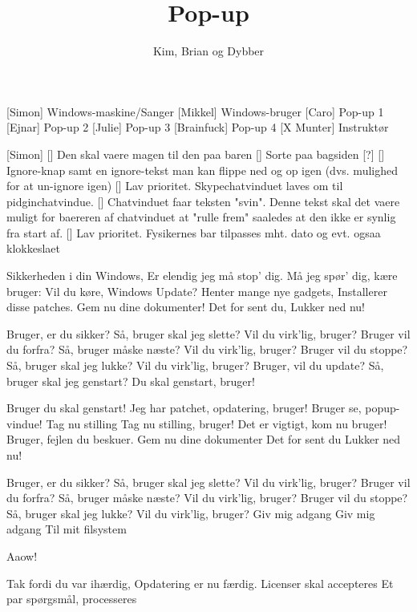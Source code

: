 \documentclass[a4paper,11pt]{article}
\title{Pop-up}
\author{Kim, Brian og Dybber}
\begin{document}
\maketitle

\begin{roles}
[Simon] Windows-maskine/Sanger
[Mikkel] Windows-bruger
[Caro] Pop-up 1
[Ejnar] Pop-up 2
[Julie] Pop-up 3
[Brainfuck] Pop-up 4
[X Munter] Instruktør
\end{roles}

\begin{props}
[Simon]
[] Den skal vaere magen til den paa baren
[] Sorte paa bagsiden
[?]
[] Ignore-knap samt en ignore-tekst man kan flippe ned og op igen (dvs. mulighed for at un-ignore igen)
[] Lav prioritet. Skypechatvinduet laves om til pidginchatvindue.
[] Chatvinduet faar teksten "svin". Denne tekst skal det vaere muligt for baereren af chatvinduet at "rulle frem" saaledes at den ikke er synlig fra start af.
[] Lav prioritet. Fysikernes bar tilpasses mht. dato og evt. ogsaa klokkeslaet
\end{props}


\begin{song}
Sikkerheden i din Windows,
Er elendig jeg må stop' dig.
Må jeg spør' dig, kære bruger:
Vil du køre, Windows Update?
Henter mange nye gadgets,
Installerer disse patches.
Gem nu dine dokumenter!
Det for sent du,
Lukker ned nu!

Bruger, er du sikker?
Så, bruger skal jeg slette?
Vil du virk'lig, bruger?
Bruger vil du forfra?
Så, bruger måske næste?
Vil du virk'lig, bruger?
Bruger vil du stoppe?
Så, bruger skal jeg lukke?
Vil du virk'lig, bruger?
Bruger, vil du update?
Så, bruger skal jeg genstart?
Du skal genstart, bruger!

Bruger du skal genstart!
Jeg har patchet, opdatering, bruger!
Bruger se, popup-vindue!
Tag nu stilling
Tag nu stilling, bruger!
Det er vigtigt, kom nu bruger!
Bruger, fejlen du beskuer.
Gem nu dine dokumenter
Det for sent du
Lukker ned nu!

Bruger, er du sikker?
Så, bruger skal jeg slette?
Vil du virk'lig, bruger?
Bruger vil du forfra?
Så, bruger måske næste?
Vil du virk'lig, bruger?
Bruger vil du stoppe?
Så, bruger skal jeg lukke?
Vil du virk'lig, bruger?
Giv mig adgang
Giv mig adgang
Til mit filsystem

Aaow!

Tak fordi du var ihærdig,
Opdatering er nu færdig.
Licenser skal accepteres
Et par spørgsmål, processeres
\end{song}
\end{document}
